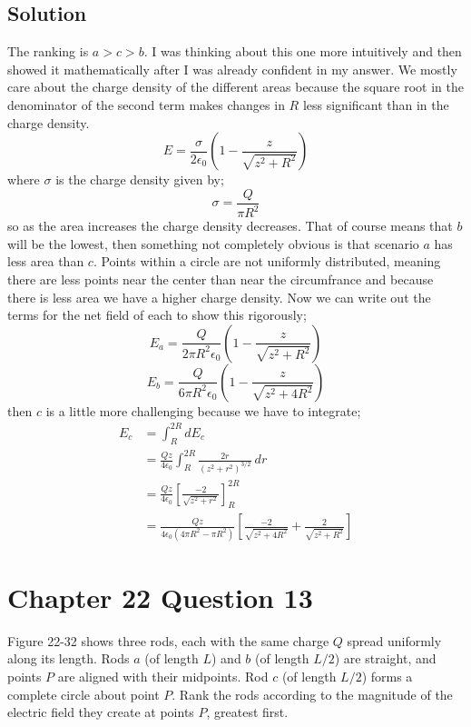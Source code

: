 \documentclass{article}
\begin{document}
\subsection*{Solution}
The ranking is $ a > c > b$. I was thinking about this one more intuitively and then showed it mathematically after I was already confident in my answer. We mostly care about the charge density of the different areas because the square root in the denominator of the second term makes changes in $R$ less significant than in the charge density.
\[
	E = \frac{\sigma}{2\epsilon_0} \left( 1 - \frac{z}{\sqrt{z^2 + R^2}}\right)
\]
where $\sigma$ is the charge density given by;
\[
	\sigma = \frac{Q}{\pi R^2}
\]
so as the area increases the charge density decreases. That of course means that $b$ will be the lowest, then something not completely obvious is that scenario $a$ has less area than $c$. Points within a circle are not uniformly distributed, meaning there are less points near the center than near the circumfrance and because there is less area we have a higher charge density. Now we can write out the terms for the net field of each to show this rigorously;
\[
	E_a = \frac{Q}{2\pi R^2\epsilon_0} \left( 1 - \frac{z}{\sqrt{z^2 + R^2}}\right)
\]
\[
	E_b = \frac{Q}{6\pi R^2\epsilon_0} \left( 1 - \frac{z}{\sqrt{z^2 + 4R^2}}\right)
\]
then $c$ is a little more challenging because we have to integrate;
\begin{align*}
	E_c &= \int_R^{2R} dE_c \\
		&= \frac{Q z}{4\epsilon_0} \int_R^{2R}\frac{2r}{\left(z^2 + r^2\right)^{3/2}} \ dr \\
		&= \frac{Qz}{4\epsilon_0} \left[\frac{-2}{\sqrt{z^2+r^2}}\right]_R^{2R} \\
		&= \frac{Qz}{4\epsilon_0 \left(4\pi R^2 -\pi R^2\right)} \left[\frac{-2}{\sqrt{z^2+4R^2}} + \frac{2}{\sqrt{z^2+R^2}}\right] 
\end{align*}

\section*{Chapter 22 Question 13}
Figure 22-32 shows three rods, each with the same charge $Q$ spread uniformly along its length. Rods $a$ (of length $L$) and $b$ (of
length $L/2$) are straight, and points $P$ are aligned with their midpoints. Rod $c$ (of length $L/2$) forms a complete circle about point $P$.
Rank the rods according to the magnitude of the electric field they create at points $P$, greatest first.
\end{document}
